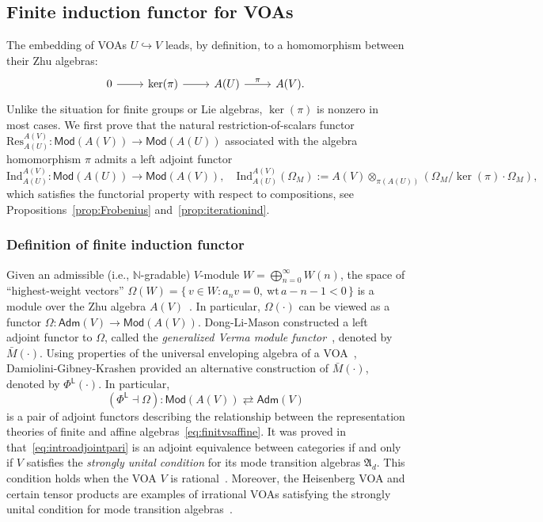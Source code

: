 \documentclass[12pt,a4paper,reqno]{amsart}
\numberwithin{equation}{section}
\numberwithin{equation}{section}
\theoremstyle{definition}
\def\Ind{\mathrm{Ind}}
\def\Ind{\mathrm{Ind}}
\def\LL{\mathsf{L}}
\begin{document}
	\subsection{Finite induction functor for VOAs}
The embedding of VOAs $U \hookrightarrow V$ leads, by definition, to a homomorphism between their Zhu algebras:
\[
\begin{tikzcd}
	0 \arrow[r] & \ker(\pi) \arrow[r] & A(U) \arrow[r, "\pi"] & A(V).
\end{tikzcd}
\]
Unlike the situation for finite groups or Lie algebras, $\ker(\pi)$ is nonzero in most cases. We first prove that the natural restriction-of-scalars functor $\mathrm{Res}^{A(V)}_{A(U)}: \mathsf{Mod}(A(V)) \to \mathsf{Mod}(A(U))$ associated with the algebra homomorphism $\pi$ admits a left adjoint functor
\[
\Ind^{A(V)}_{A(U)}: \mathsf{Mod}(A(U)) \to \mathsf{Mod}(A(V)), \quad 
\Ind^{A(V)}_{A(U)}(\Omega_M) := A(V) \otimes_{\pi(A(U))} (\Omega_M / \ker(\pi) \cdot \Omega_M),
\]
which satisfies the functorial property with respect to compositions, see Propositions~\ref{prop:Frobenius} and~\ref{prop:iterationind}.

\subsubsection{Definition of finite induction functor}

Given an admissible (i.e., $\mathbb{N}$-gradable) $V$-module $W = \bigoplus_{n=0}^\infty W(n)$, the space of “highest-weight vectors”
$
\Omega(W) = \{\, v \in W : a_n v = 0,\ \mathrm{wt}\, a - n - 1 < 0 \,\}
$
is a module over the Zhu algebra $A(V)$~\cite{Z}. In particular, $\Omega(\cdot)$ can be viewed as a functor $\Omega: \mathsf{Adm}(V) \to \mathsf{Mod}(A(V))$. Dong-Li-Mason constructed a left adjoint functor to $\Omega$, called the \emph{generalized Verma module functor}~\cite{DLM1}, denoted by $\bar{M}(\cdot)$. Using properties of the universal enveloping algebra of a VOA~\cite{FZ92,FBZ04}, Damiolini-Gibney-Krashen provided an alternative construction of $\bar{M}(\cdot)$, denoted by $\Phi^\LL(\cdot)$. In particular,
\begin{equation}\label{eq:introadjointpari}
	(\Phi^\LL \dashv \Omega): \mathsf{Mod}(A(V)) \rightleftarrows \mathsf{Adm}(V)
\end{equation}
is a pair of adjoint functors describing the relationship between the representation theories of finite and affine algebras~\eqref{eq:finitvsaffine}. 
It was proved in~\cite{DGK2,GGKL25,DLM1} that~\eqref{eq:introadjointpari} is an adjoint equivalence between categories if and only if $V$ satisfies the \emph{strongly unital condition} for its mode transition algebras $\mathfrak{A}_d$. This condition holds when the VOA $V$ is rational~\cite{DGK23}. Moreover, the Heisenberg VOA and certain tensor products are examples of irrational VOAs satisfying the strongly unital condition for mode transition algebras~\cite{DGK2,LS25}.
\end{document}
